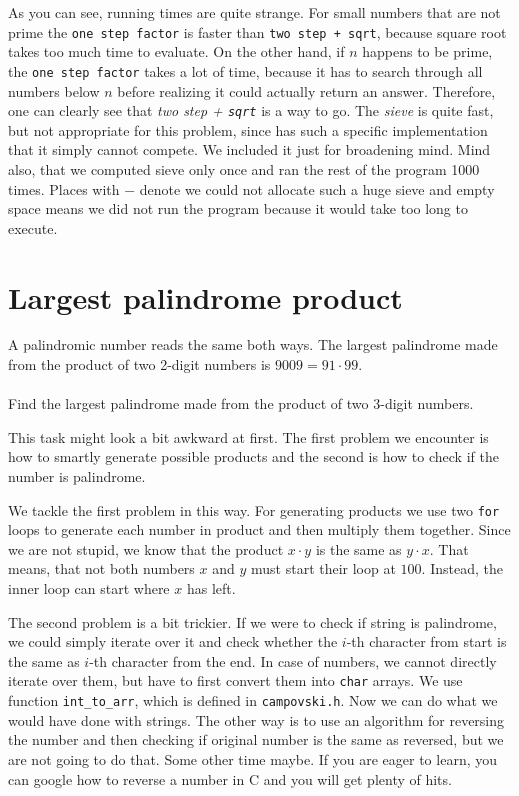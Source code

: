 \documentclass{book}
\newenvironment{task}
  {\begin{mdframed}[backgroundcolor=lightgray]}
  {\end{mdframed}}
\begin{document}
As you can see, running times are quite strange. For small numbers that are not prime the \texttt{one step \texttt{factor}} is faster than \texttt{two step + \texttt{sqrt}}, because square root takes too much time to evaluate. On the other hand, if $n$ happens to be prime, the \texttt{one step \texttt{factor}} takes a lot of time, because it has to search through all numbers below $n$ before realizing it could actually return an answer. Therefore, one can clearly see that \textit{two step + \texttt{sqrt}} is a way to go. The \textit{sieve} is quite fast, but not appropriate for this problem, since has such a specific implementation that it simply cannot compete. We included it just for broadening mind. Mind also, that we computed sieve only once and ran the rest of the program 1000 times. Places with $-$ denote we could not allocate such a huge sieve and empty space means we did not run the program because it would take too long to execute.



\section{Largest palindrome product}

\begin{task}
A palindromic number reads the same both ways. The largest palindrome made from the product of two 2-digit numbers is $9009 = 91 \cdot 99$.\\
\\
Find the largest palindrome made from the product of two 3-digit numbers.
\end{task}

This task might look a bit awkward at first. The first problem we encounter is how to smartly generate possible products and the second is how to check if the number is palindrome.

We tackle the first problem in this way. For generating products we use two \texttt{for} loops to generate each number in product and then multiply them together. Since we are not stupid, we know that the product $x \cdot y$ is the same as $y \cdot x$. That means, that not both numbers $x$ and $y$ must start their loop at $100$. Instead, the inner loop can start where $x$ has left.

The second problem is a bit trickier. If we were to check if string is palindrome, we could simply iterate over it and check whether the $i$-th character from start is the same as $i$-th character from the end. In case of numbers, we cannot directly iterate over them, but have to first convert them into \texttt{char} arrays. We use function \texttt{int\_to\_arr}, which is defined in \texttt{campovski.h}. Now we can do what we would have done with strings. The other way is to use an algorithm for reversing the number and then checking if original number is the same as reversed, but we are not going to do that. Some other time maybe. If you are eager to learn, you can google how to reverse a number in C and you will get plenty of hits.\\
\end{document}
